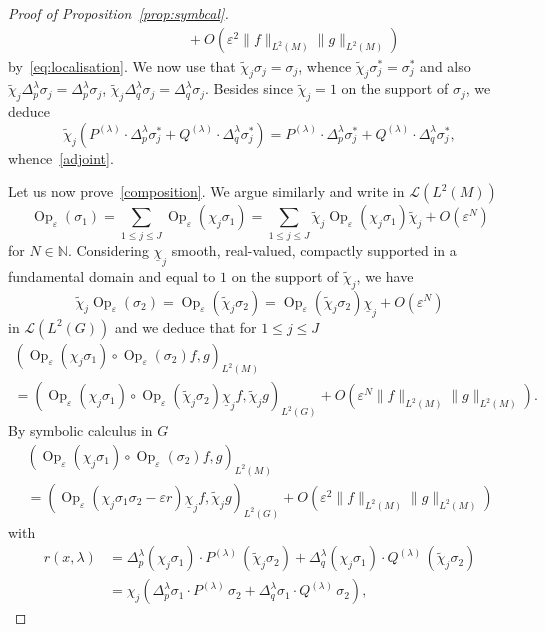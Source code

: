 \documentclass[JEP,XML,SOM,Unicode,published]{cedram}
\let\mathcal\mathscr
\DeclareMathOperator{\Op}{Op}
\theoremstyle{plain}
\theoremstyle{definition}
\let\eps\varepsilon
\def\N{{\mathbb N}}
\begin{document}
\begin{proof}[Proof of Proposition~\ref{prop:symbcal}]
\begin{align*}
&\qquad \qquad+O(\eps^2 \| f\|_{L^2(M)} \| g\|_{L^2(M)})
\end{align*}
by~\eqref{eq:localisation}.
We now use that $\widetilde \chi_j \sigma_j=\sigma_j$, whence $\widetilde \chi_j \sigma_j^*=\sigma_j^*$ and also
$\widetilde \chi_j \Delta_p^\lambda \sigma_j = \Delta_p^\lambda \sigma_j$, $\widetilde \chi_j \Delta_q^\lambda \sigma_j = \Delta_q^\lambda \sigma_j
$. Besides since $\widetilde \chi_j=1$ on the support of $\sigma_j$, we deduce
\[
\widetilde \chi_j (P^{(\lambda)}\cdot \Delta^\lambda_p \sigma_j^*+Q^{(\lambda)}\cdot \Delta^\lambda_q \sigma_j^*)
=P^{(\lambda)}\cdot \Delta^\lambda_p \sigma_j^*+Q^{(\lambda)}\cdot \Delta^\lambda_q \sigma_j^*,
\]
whence~\eqref{adjoint}.

Let us now prove~\eqref{composition}. We argue similarly and write in $\mathcal L (L^2(M))$
\[
\Op_\eps(\sigma_1) = \sum_{1\leq j\leq J} \Op_\eps(\chi_j\sigma_1) = \sum_{1\leq j\leq J} \widetilde \chi_j\Op_\eps(\chi_j\sigma_1)\widetilde \chi_j +O(\eps^N)
\]
for $N\in\N$. Considering $\underline \chi_j$ smooth, real-valued, compactly supported in a fundamental domain and equal to $1$ on the support of $\widetilde \chi_j$,
we have
\[
\widetilde \chi_j \Op_\eps (\sigma_2)= \Op_\eps (\widetilde \chi_j\sigma_2)= \Op_\eps (\widetilde \chi_j\sigma_2)\underline\chi_j +O(\eps^N)
\]
in $\mathcal L (L^2(G))$ and
we deduce that for $1\leq j\leq J$
\begin{multline*}
\left(\Op_\eps (\chi_j\sigma_1)\circ \Op_\eps (\sigma_2) f,g\right)_{L^2(M)}\\
= \left(\Op_\eps (\chi_j\sigma_1)\circ \Op_\eps (\widetilde \chi_j\sigma_2) \underline \chi_jf, \widetilde \chi_jg\right)_{L^2(G)}
+O(\eps^N\| f\|_{L^2(M)}\| g\|_{L^2(M)}).
\end{multline*}
By symbolic calculus in $G$
\begin{multline*}
\left(\Op_\eps (\chi_j\sigma_1)\circ \Op_\eps (\sigma_2) f,g\right)_{L^2(M)}\\
= \left(\Op_\eps (\chi_j \sigma_1 \sigma_2 -\eps r) \underline \chi_jf, \widetilde \chi_j g\right)_{L^2(G)} +O(\eps^2\| f\|_{L^2(M)}\| g\|_{L^2(M)})
\end{multline*}
with
\begin{align*}
r(x,\lambda)&= \Delta_p^\lambda (\chi_j \sigma_1) \cdot P^{(\lambda)}\,(\widetilde \chi_j\sigma_2)+\Delta^\lambda_q (\chi_j\sigma_1) \cdot Q^{(\lambda)}\, (\widetilde \chi_j \sigma_2)\\
&=
\chi_j(\Delta_p^\lambda \sigma_1 \cdot P^{(\lambda)}\,\sigma_2+\Delta^\lambda_q \sigma_1 \cdot Q^{(\lambda)}\, \sigma_2),

\end{align*}
\end{proof}
\end{document}
